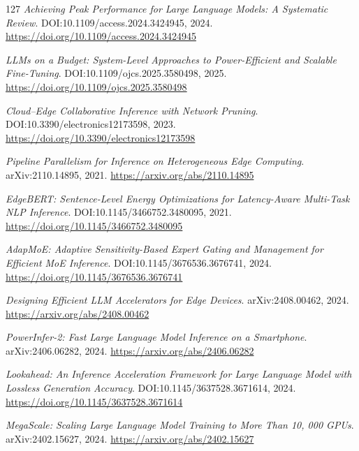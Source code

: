 \documentclass[11pt,a4paper]{article}
\begin{document}
\begin{thebibliography}{127}
\newblock \emph{Achieving Peak Performance for Large Language Models: A Systematic Review}.
\newblock DOI:10.1109/access.2024.3424945, 2024.
\newblock \url{https://doi.org/10.1109/access.2024.3424945}

\newblock \emph{LLMs on a Budget: System-Level Approaches to Power-Efficient and Scalable Fine-Tuning}.
\newblock DOI:10.1109/ojcs.2025.3580498, 2025.
\newblock \url{https://doi.org/10.1109/ojcs.2025.3580498}

\newblock \emph{Cloud--Edge Collaborative Inference with Network Pruning}.
\newblock DOI:10.3390/electronics12173598, 2023.
\newblock \url{https://doi.org/10.3390/electronics12173598}

\newblock \emph{Pipeline Parallelism for Inference on Heterogeneous Edge Computing}.
\newblock arXiv:2110.14895, 2021.
\newblock \url{https://arxiv.org/abs/2110.14895}

\newblock \emph{EdgeBERT: Sentence-Level Energy Optimizations for Latency-Aware Multi-Task NLP Inference}.
\newblock DOI:10.1145/3466752.3480095, 2021.
\newblock \url{https://doi.org/10.1145/3466752.3480095}

\newblock \emph{AdapMoE: Adaptive Sensitivity-Based Expert Gating and Management for Efficient MoE Inference}.
\newblock DOI:10.1145/3676536.3676741, 2024.
\newblock \url{https://doi.org/10.1145/3676536.3676741}

\newblock \emph{Designing Efficient LLM Accelerators for Edge Devices}.
\newblock arXiv:2408.00462, 2024.
\newblock \url{https://arxiv.org/abs/2408.00462}

\newblock \emph{PowerInfer-2: Fast Large Language Model Inference on a Smartphone}.
\newblock arXiv:2406.06282, 2024.
\newblock \url{https://arxiv.org/abs/2406.06282}

\newblock \emph{Lookahead: An Inference Acceleration Framework for Large Language Model with Lossless Generation Accuracy}.
\newblock DOI:10.1145/3637528.3671614, 2024.
\newblock \url{https://doi.org/10.1145/3637528.3671614}

\newblock \emph{MegaScale: Scaling Large Language Model Training to More Than 10, 000 GPUs}.
\newblock arXiv:2402.15627, 2024.
\newblock \url{https://arxiv.org/abs/2402.15627}


\end{thebibliography}
\end{document}
